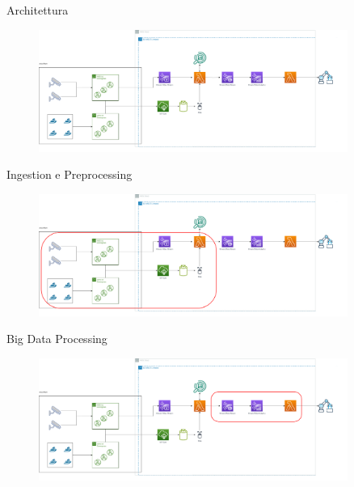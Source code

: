 \documentclass{beamer}
\begin{document}
\begin{frame}{Architettura}
\begin{figure}
    \centering
    \includegraphics[width=0.9\textwidth]{images/architettura.png}
\end{figure}
\end{frame}

\begin{frame}{Ingestion e Preprocessing}
\begin{figure}
    \centering
    \includegraphics[width=0.9\textwidth]{images/sottosistema-ingestion.png}
\end{figure}

\end{frame}

\begin{frame}{Big Data Processing}
\begin{figure}
    \centering
    \includegraphics[width=0.9\textwidth]{images/processing-subsystem.png}
\end{figure}

\end{frame}
\end{document}
